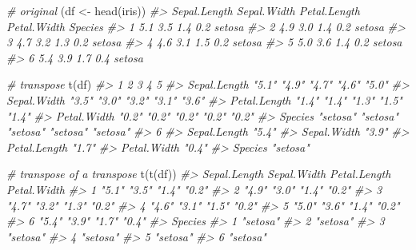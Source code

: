 \documentclass[
]{book}
\newenvironment{Shaded}{\begin{snugshade}}{\end{snugshade}}
\newcommand{\CommentTok}[1]{\textcolor[rgb]{0.56,0.35,0.01}{\textit{#1}}}
\newcommand{\FunctionTok}[1]{\textcolor[rgb]{0.00,0.00,0.00}{#1}}
\newcommand{\NormalTok}[1]{#1}
\newcommand{\OtherTok}[1]{\textcolor[rgb]{0.56,0.35,0.01}{#1}}
\begin{document}
\begin{Shaded}
\begin{Highlighting}[]
\CommentTok{\# original}
\NormalTok{(df }\OtherTok{\textless{}{-}} \FunctionTok{head}\NormalTok{(iris))}
\CommentTok{\#\textgreater{}   Sepal.Length Sepal.Width Petal.Length Petal.Width Species}
\CommentTok{\#\textgreater{} 1          5.1         3.5          1.4         0.2  setosa}
\CommentTok{\#\textgreater{} 2          4.9         3.0          1.4         0.2  setosa}
\CommentTok{\#\textgreater{} 3          4.7         3.2          1.3         0.2  setosa}
\CommentTok{\#\textgreater{} 4          4.6         3.1          1.5         0.2  setosa}
\CommentTok{\#\textgreater{} 5          5.0         3.6          1.4         0.2  setosa}
\CommentTok{\#\textgreater{} 6          5.4         3.9          1.7         0.4  setosa}

\CommentTok{\# transpose}
\FunctionTok{t}\NormalTok{(df)}
\CommentTok{\#\textgreater{}              1        2        3        4        5       }
\CommentTok{\#\textgreater{} Sepal.Length "5.1"    "4.9"    "4.7"    "4.6"    "5.0"   }
\CommentTok{\#\textgreater{} Sepal.Width  "3.5"    "3.0"    "3.2"    "3.1"    "3.6"   }
\CommentTok{\#\textgreater{} Petal.Length "1.4"    "1.4"    "1.3"    "1.5"    "1.4"   }
\CommentTok{\#\textgreater{} Petal.Width  "0.2"    "0.2"    "0.2"    "0.2"    "0.2"   }
\CommentTok{\#\textgreater{} Species      "setosa" "setosa" "setosa" "setosa" "setosa"}
\CommentTok{\#\textgreater{}              6       }
\CommentTok{\#\textgreater{} Sepal.Length "5.4"   }
\CommentTok{\#\textgreater{} Sepal.Width  "3.9"   }
\CommentTok{\#\textgreater{} Petal.Length "1.7"   }
\CommentTok{\#\textgreater{} Petal.Width  "0.4"   }
\CommentTok{\#\textgreater{} Species      "setosa"}

\CommentTok{\# transpose of a transpose}
\FunctionTok{t}\NormalTok{(}\FunctionTok{t}\NormalTok{(df))}
\CommentTok{\#\textgreater{}   Sepal.Length Sepal.Width Petal.Length Petal.Width}
\CommentTok{\#\textgreater{} 1 "5.1"        "3.5"       "1.4"        "0.2"      }
\CommentTok{\#\textgreater{} 2 "4.9"        "3.0"       "1.4"        "0.2"      }
\CommentTok{\#\textgreater{} 3 "4.7"        "3.2"       "1.3"        "0.2"      }
\CommentTok{\#\textgreater{} 4 "4.6"        "3.1"       "1.5"        "0.2"      }
\CommentTok{\#\textgreater{} 5 "5.0"        "3.6"       "1.4"        "0.2"      }
\CommentTok{\#\textgreater{} 6 "5.4"        "3.9"       "1.7"        "0.4"      }
\CommentTok{\#\textgreater{}   Species }
\CommentTok{\#\textgreater{} 1 "setosa"}
\CommentTok{\#\textgreater{} 2 "setosa"}
\CommentTok{\#\textgreater{} 3 "setosa"}
\CommentTok{\#\textgreater{} 4 "setosa"}
\CommentTok{\#\textgreater{} 5 "setosa"}
\CommentTok{\#\textgreater{} 6 "setosa"}


\end{Highlighting}
\end{Shaded}
\end{document}
